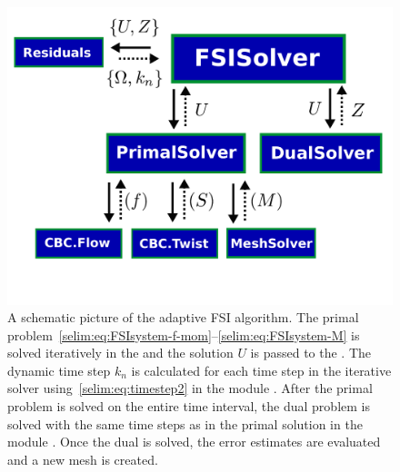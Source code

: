 \begin{figure}
\bwfig
  \centering
  \includegraphics[width=\largefig]{chapters/selim/pdf/adaptive.pdf}
  \caption{A schematic picture of the adaptive FSI algorithm. The primal
    problem~\eqref{selim:eq:FSIsystem-f-mom}--\eqref{selim:eq:FSIsystem-M}
 is solved iteratively in the
     and the solution $U$ is passed to the
    . The dynamic time step $k_n$ is calculated for
    each time step in the iterative solver 
    using~\eqref{selim:eq:timestep2} in the module
    . After the primal problem is solved on the entire
    time interval, the dual problem is solved with the same time steps
    as in the primal solution in the module . Once
    the dual is solved, the error estimates are evaluated and a new mesh
    is created.}
  \label{selim:fig:adaptiveMAP}
\end{figure}

